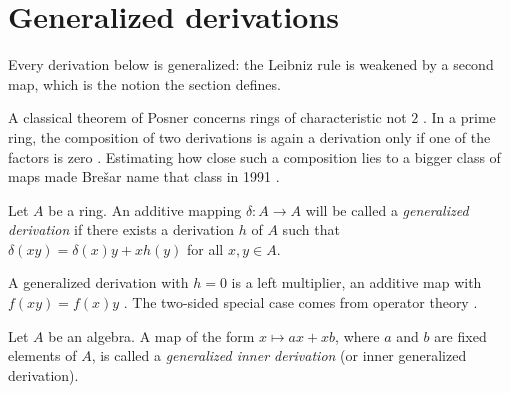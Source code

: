 \section{Generalized derivations}\label{sec:generalized-twisted:generalized}

Every derivation below is generalized: the Leibniz rule is weakened by a
second map, which is the notion the section defines. %

A classical theorem of Posner concerns rings of characteristic not $2$
\cite[Theorem~2, p.~1097]{Posner1957}.
In a prime ring, the composition of two derivations is again a derivation only
if one of the factors is zero \cite[Theorem~2, p.~1097]{Posner1957}.
Estimating how close such a composition lies to a bigger class of maps made
Brešar name that class in 1991 \cite[p.~89]{Bresar1991Glasgow}.

\begin{definition}\label{def:gen:giderivation}
Let $A$ be a ring. An additive mapping $\delta\colon A\to A$ will be called a
\emph{generalized derivation} if there exists a derivation $h$ of $A$ such
that $\delta(xy)=\delta(x)y+xh(y)$ for all $x,y\in A$.
\end{definition}

A generalized derivation with $h=0$ is a left multiplier, an additive map
with $f(xy)=f(x)y$ \cite[p.~1148]{Hvala1998}. The two-sided special case
comes from operator theory \cite[p.~1147]{Hvala1998}.

\begin{definition}\label{def:gen:inner}
Let $A$ be an algebra. A map of the form $x\mapsto ax+xb$, where $a$ and $b$
are fixed elements of $A$, is called a \emph{generalized inner derivation}
(or inner generalized derivation).
\end{definition}

